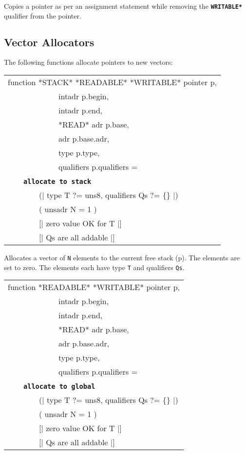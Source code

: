 \documentclass[12pt]{article}
\makeatletter
\newcommand{\TT}[1]{{\tt \bfseries #1}}
\newcommand{\ttkey}[1]{\TT{#1}\index{#1@{\tt #1}}}
\newcommand{\pagref}[1]{p\pageref{#1}}
\newenvironment{indpar}[1][0.3in]%
	{\begin{list}{}%
		     {\setlength{\itemsep}{0in}%
		      \setlength{\topsep}{0in}%
		      \setlength{\parsep}{1ex}%
		      \setlength{\labelwidth}{#1}%
		      \setlength{\leftmargin}{#1}%
		      \addtolength{\leftmargin}{\labelsep}}%
	 \item}%
	{\end{list}}
\makeatother
\begin{document}
\begin{indpar}
Copies a pointer as per an assignment statement while removing the
\TT{*WRITABLE*} qualifier from the pointer.
\end{indpar}

\subsection{Vector Allocators}
\label{VECTOR-ALLOCATORS}


The following functions allocate pointers to new vectors:

\begin{indpar}


{\tt\begin{tabular}{@{}l}
function *STACK* *READABLE* *WRITABLE* pointer p, \\
~~~~~~~~~~~~~intadr p.begin, \\
~~~~~~~~~~~~~intadr p.end, \\
~~~~~~~~~~~~~*READ* adr p.base, \\
~~~~~~~~~~~~~adr p.base.adr, \\
~~~~~~~~~~~~~type p.type, \\
~~~~~~~~~~~~~qualifiers p.qualifiers = \\
~~~~\ttkey{allocate to stack} \\
~~~~~~~~(| type T ?= uns8, qualifiers Qs ?= \{\} |) \\
~~~~~~~~( unsadr N = 1 ) \\
~~~~~~~~[| zero value OK for T |] \\
~~~~~~~~[| Qs are all addable |] \\
\end{tabular}}\label{POINTER-ALLOCATE-TO-STACK}

\begin{indpar}
Allocates a vector of {\tt N} elements to the current free
stack (\pagref{FREE-STACK}).  The elements are set to zero.
The elements each have type {\tt T} and qualifiers {\tt Qs}.
\end{indpar}

{\tt\begin{tabular}{@{}l}
function *READABLE* *WRITABLE* pointer p, \\
~~~~~~~~~~~~~intadr p.begin, \\
~~~~~~~~~~~~~intadr p.end, \\
~~~~~~~~~~~~~*READ* adr p.base, \\
~~~~~~~~~~~~~adr p.base.adr, \\
~~~~~~~~~~~~~type p.type, \\
~~~~~~~~~~~~~qualifiers p.qualifiers = \\
~~~~\ttkey{allocate to global} \\
~~~~~~~~(| type T ?= uns8, qualifiers Qs ?= \{\} |) \\
~~~~~~~~( unsadr N = 1 ) \\
~~~~~~~~[| zero value OK for T |] \\
~~~~~~~~[| Qs are all addable |] \\
\end{tabular}}\label{POINTER-ALLOCATE-TO-GLOBAL}


\end{indpar}
\end{document}
